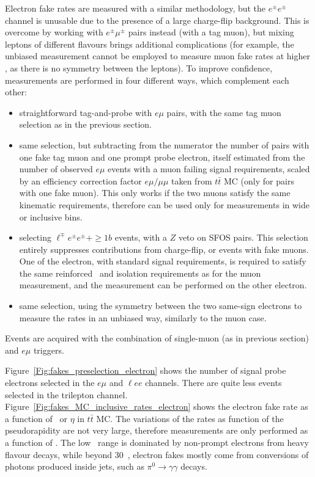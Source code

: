 Electron fake rates are measured with a similar methodology, but the $e^\pm e^\pm$ channel is unusable due to the presence of a large charge-flip background. 
This is overcome by working with $e^\pm\mu^\pm$ pairs instead (with a tag muon), but mixing leptons of different flavours brings additional complications 
(for example, the unbiased measurement cannot be employed to measure muon fake rates at higher \pt, as there is no symmetry between the leptons). 
To improve confidence, measurements are performed in four different ways, which complement each other: 
\begin{itemize}
\item straightforward tag-and-probe with $e\mu$ pairs, with the same tag muon selection as in the previous section. 
\item same selection, but subtracting from the numerator the number of pairs with one fake tag muon and one prompt probe electron, 
itself estimated from the number of observed $e\mu$ events with a muon failing signal requirements, 
scaled by an efficiency correction factor $e\mu/\mu\mu$ taken from $t\bar t$ MC (only for pairs with one fake muon). 
This only works if the two muons satisfy the same kinematic requirements, therefore can be used only for measurements in wide or inclusive bins. 
\item selecting $\ell^\mp e^\pm e^\pm+\ge 1b$ events, with a $Z$ veto on SFOS pairs. 
This selection entirely suppresses contributions from charge-flip, or events with fake muons. 
One of the electron, with standard signal requirements, is required to satisfy the same reinforced \pt\ and isolation requirements as for the muon measurement,
and the measurement can be performed on the other electron. 
\item same selection, using the symmetry between the two same-sign electrons to measure the rates in an unbiased way, similarly to the muon case. 
\end{itemize}
Events are acquired with the combination of single-muon (as in previous section) and $e\mu$ triggers. 


Figure~\ref{Fig:fakes_preselection_electron} shows the number of signal probe electrons selected in the $e\mu$ and $\ell ee$ channels. 
There are quite less events selected in the trilepton channel. 
Figure~\ref{Fig:fakes_MC_inclusive_rates_electron} shows the electron fake rate as a function of \pt\ or $\eta$ in $t\bar t$ MC. 
The variations of the rates as function of the pseudorapidity are not very large, 
therefore measurements are only performed as a function of \pt. 
The low \pt\ range is dominated by non-prompt electrons from heavy flavour decays, while beyond 30~\GeV, 
electron fakes mostly come from conversions of photons produced inside jets, such as $\pi^0\to\gamma\gamma$ decays. 


